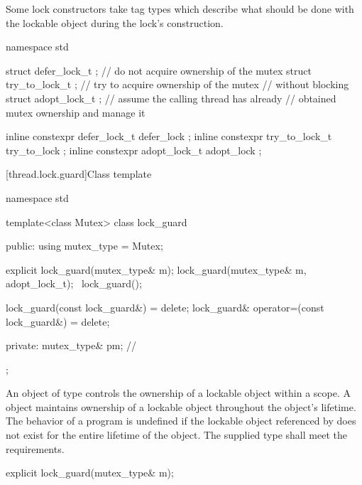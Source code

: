 \pnum
Some lock constructors take tag types which describe what should be done with the lockable
object during the lock's construction.

%
%
%
%
%
%
\begin{codeblock}
namespace std {
  struct defer_lock_t  { };     // do not acquire ownership of the mutex
  struct try_to_lock_t { };     // try to acquire ownership of the mutex
                                // without blocking
  struct adopt_lock_t  { };     // assume the calling thread has already
                                // obtained mutex ownership and manage it

  inline constexpr defer_lock_t  defer_lock { };
  inline constexpr try_to_lock_t try_to_lock { };
  inline constexpr adopt_lock_t  adopt_lock { };
}
\end{codeblock}

[thread.lock.guard]{Class template }

%
\begin{codeblock}
namespace std {
  template<class Mutex>
  class lock_guard {
  public:
    using mutex_type = Mutex;

    explicit lock_guard(mutex_type& m);
    lock_guard(mutex_type& m, adopt_lock_t);
    ~lock_guard();

    lock_guard(const lock_guard&) = delete;
    lock_guard& operator=(const lock_guard&) = delete;

  private:
    mutex_type& pm;             // \expos
  };
}
\end{codeblock}

\pnum
An object of type  controls the ownership of a lockable object
within a scope. A  object maintains ownership of a lockable
object throughout the  object's lifetime.
The behavior of a program is undefined if the lockable object referenced by
 does not exist for the entire lifetime of the 
object. The supplied  type shall meet the 
requirements.

%
\begin{itemdecl}
explicit lock_guard(mutex_type& m);
\end{itemdecl}

